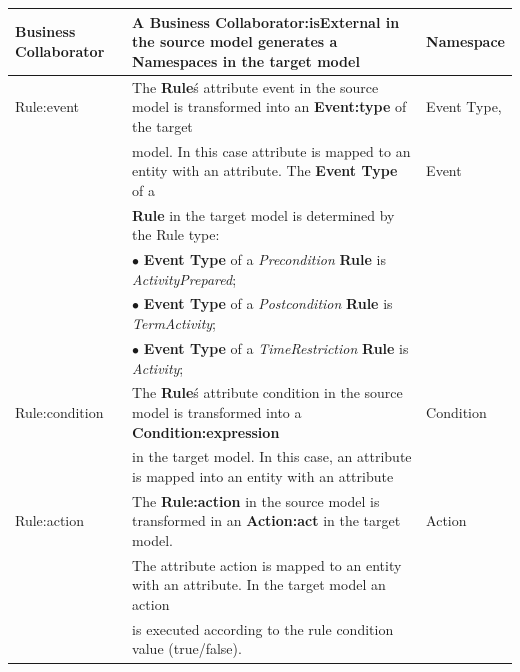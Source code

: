 \begin{table}[ht!]
\begin{tabular}{l|l|l}
    \hline

    Business Collaborator   & A \textbf{Business Collaborator:isExternal} in the
    source model generates a \textbf{Namespaces} in the target model  &
    Namespace\\
    \hline

    Rule:event   &  The \textbf{Rule}\'s attribute event in the source model is
    transformed into an \textbf{Event:type} of the target  & Event Type,\\
    & model. In this case attribute is mapped to an
entity with an attribute. The \textbf{Event Type} of a & Event\\
  & \textbf{Rule} in the target model is
determined by the Rule type: & \\
     &  $\bullet$ \textbf{Event Type} of a \textit{Precondition} \textbf{Rule} is
     \textit{ActivityPrepared}; & \\
     &  $\bullet$ \textbf{Event Type} of a \textit{Postcondition} \textbf{Rule}
     is \textit{TermActivity}; & \\
    &  $\bullet$ \textbf{Event Type} of a \textit{TimeRestriction} \textbf{Rule}
     is \textit{Activity}; & \\
    \hline

    Rule:condition   &  The \textbf{Rule}\'s attribute condition in the source
    model is transformed into a \textbf{Condition:expression}  & Condition\\
    &  in the target model.  In this case, an attribute is
mapped into an entity with an attribute  & \\
    \hline

    Rule:action   & The \textbf{Rule:action} in the source model is
    transformed in an \textbf{Action:act} in the target model.  & Action\\
    & The attribute action is mapped to an entity with an attribute. In the
    target model an action & \\
    & is executed according to the rule condition value (true/false). & \\

    \hline


\end{tabular}
\end{table}
